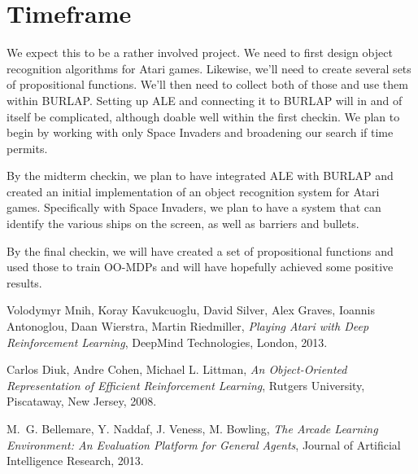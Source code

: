 \documentclass[11pt]{article}
\begin{document}
\section{Timeframe}
\label{S:timeframe}

We expect this to be a rather involved project. We need to first design object recognition algorithms for Atari games. Likewise, we'll need to create several sets of propositional functions. We'll then need to collect both of those and use them within BURLAP. Setting up ALE and connecting it to BURLAP will in and of itself be complicated, although doable well within the first checkin. We plan to begin by working with only Space Invaders and broadening our search if time permits.

By the midterm checkin, we plan to have integrated ALE with BURLAP and created an initial implementation of an object recognition system for Atari games. Specifically with Space Invaders, we plan to have a system that can identify the various ships on the screen, as well as barriers and bullets.

By the final checkin, we will have created a set of propositional functions and used those to train OO-MDPs and will have hopefully achieved some positive results.

\begin{thebibliography}{9}

  Volodymyr Mnih, Koray Kavukcuoglu, David Silver, Alex Graves, Ioannis Antonoglou, Daan Wierstra, Martin Riedmiller,
  \emph{Playing Atari with Deep Reinforcement Learning},
  DeepMind Technologies, London,
  2013.

  Carlos Diuk, Andre Cohen, Michael L. Littman,
  \emph{An Object-Oriented Representation of Efficient Reinforcement Learning},
  Rutgers University, Piscataway, New Jersey,
  2008.
  
  M.~G. Bellemare, Y. Naddaf, J. Veness, M. Bowling,
  \emph{The Arcade Learning Environment: An Evaluation Platform for General Agents},
  Journal of Artificial Intelligence Research,
  2013.

\end{thebibliography}
\end{document}
